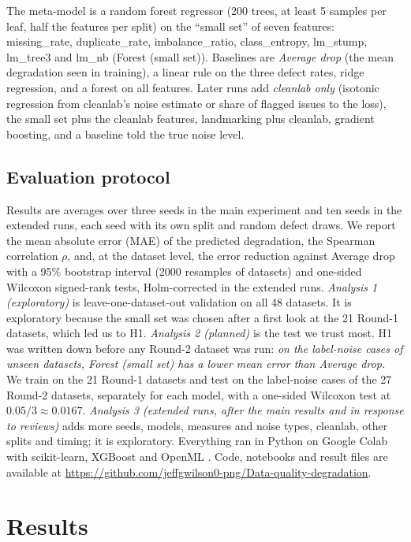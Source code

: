 \documentclass[conference]{IEEEtran}
\begin{document}
The meta-model is a random forest regressor (200 trees, at least 5 samples per leaf, half the features per split) on the ``small set'' of seven features: missing\_rate, duplicate\_rate, imbalance\_ratio, class\_entropy, lm\_stump, lm\_tree3 and lm\_nb (Forest (small set)). Baselines are \emph{Average drop} (the mean degradation seen in training), a linear rule on the three defect rates, ridge regression, and a forest on all features. Later runs add \emph{cleanlab only} (isotonic regression from cleanlab's noise estimate or share of flagged issues to the loss), the small set plus the cleanlab features, landmarking plus cleanlab, gradient boosting, and a baseline told the true noise level.

\subsection{Evaluation protocol}\label{sec:protocol}
Results are averages over three seeds in the main experiment and ten seeds in the extended runs, each seed with its own split and random defect draws. We report the mean absolute error (MAE) of the predicted degradation, the Spearman correlation $\rho$, and, at the dataset level, the error reduction against Average drop with a 95\% bootstrap interval (2000 resamples of datasets) and one-sided Wilcoxon signed-rank tests, Holm-corrected in the extended runs.
\emph{Analysis 1 (exploratory)} is leave-one-dataset-out validation on all 48 datasets. It is exploratory because the small set was chosen after a first look at the 21 Round-1 datasets, which led us to H1.
\emph{Analysis 2 (planned)} is the test we trust most. H1 was written down before any Round-2 dataset was run: \emph{on the label-noise cases of unseen datasets, Forest (small set) has a lower mean error than Average drop.} We train on the 21 Round-1 datasets and test on the label-noise cases of the 27 Round-2 datasets, separately for each model, with a one-sided Wilcoxon test at $0.05/3\approx0.0167$.
\emph{Analysis 3 (extended runs, after the main results and in response to reviews)} adds more seeds, models, measures and noise types, cleanlab, other splits and timing; it is exploratory. Everything ran in Python on Google Colab with scikit-learn, XGBoost and OpenML \cite{pedregosa2011scikit,chen2016xgboost,vanschoren2013openml}. Code, notebooks and result files are available at \url{https://github.com/jeffgwilson0-png/Data-quality-degradation}.

\section{Results}\label{sec:results}
\end{document}
